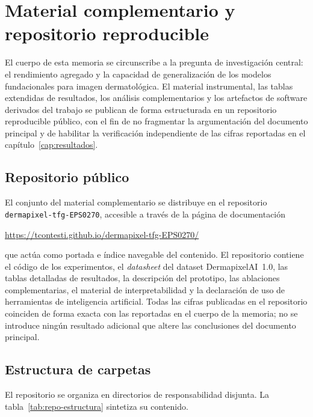
\chapter{Material complementario y repositorio reproducible}
\label{cap:repo}

El cuerpo de esta memoria se circunscribe a la pregunta de
investigación central: el rendimiento agregado y la capacidad de
generalización de los modelos fundacionales para imagen
dermatológica. El material instrumental, las tablas extendidas de
resultados, los análisis complementarios y los artefactos de
software derivados del trabajo se publican de forma estructurada en
un repositorio reproducible público, con el fin de no fragmentar la
argumentación del documento principal y de habilitar la
verificación independiente de las cifras reportadas en el
capítulo~\ref{cap:resultados}.

\section{Repositorio público}
\label{sec:repo-general}

El conjunto del material complementario se distribuye en el
repositorio \texttt{dermapixel-tfg-EPS0270}, accesible a través de
la página de documentación

\begin{center}
\url{https://tcontesti.github.io/dermapixel-tfg-EPS0270/}
\end{center}

\noindent que actúa como portada e índice navegable del contenido.
El repositorio contiene el código de los experimentos, el
\emph{datasheet} del dataset DermapixelAI~1.0, las tablas detalladas
de resultados, la descripción del prototipo, las ablaciones
complementarias, el material de interpretabilidad y la declaración
de uso de herramientas de inteligencia artificial. Todas las cifras
publicadas en el repositorio coinciden de forma exacta con las
reportadas en el cuerpo de la memoria; no se introduce ningún
resultado adicional que altere las conclusiones del documento
principal.

\section{Estructura de carpetas}
\label{sec:repo-estructura}

El repositorio se organiza en directorios de responsabilidad
disjunta. La tabla~\ref{tab:repo-estructura} sintetiza su
contenido.

